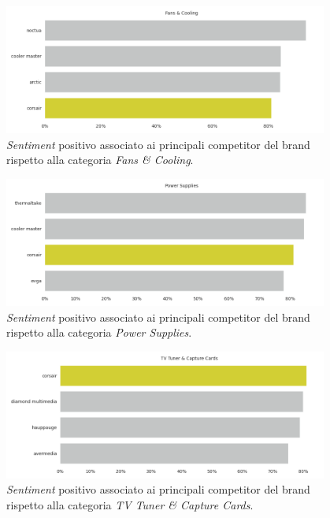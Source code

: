 \begin{figure}[p]
  \centering
  \includegraphics[width=0.95\textwidth]{images/analysis/competitors_Fans & Cooling.png}
  \caption{\textit{Sentiment} positivo associato ai principali competitor del brand rispetto alla categoria \textit{Fans \& Cooling}.}
  \label{fig:analysis_competitor_fans}
\end{figure}

\begin{figure}[p]
  \centering
  \includegraphics[width=0.95\textwidth]{images/analysis/competitors_Power Supplies.png}
  \caption{\textit{Sentiment} positivo associato ai principali competitor del brand rispetto alla categoria \textit{Power Supplies}.}
  \label{fig:analysis_competitor_power}
\end{figure}

\begin{figure}[p]
  \centering
  \includegraphics[width=0.95\textwidth]{images/analysis/competitors_TV Tuner & Capture Cards.png}
  \caption{\textit{Sentiment} positivo associato ai principali competitor del brand rispetto alla categoria \textit{TV Tuner \& Capture Cards}.}
  \label{fig:analysis_competitor_tv}
\end{figure}

